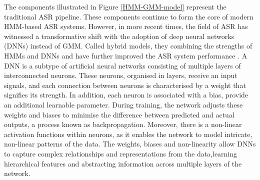 The components illustrated in Figure \ref{HMM-GMM-model} represent the traditional ASR pipeline. These components continue to form the core of modern HMM-based ASR systems. However, in more recent times, the field of ASR has witnessed a transformative shift with the adoption of deep neural networks (DNNs) instead of GMM. Called hybrid models, they combining the strengths of HMMs and DNNs and  have further improved the ASR system performance \cite{hmm-dnn}. A DNN is a subtype of artificial neural networks consisting of multiple layers of interconnected neurons. These neurons, organised in layers, receive an input signals, and each connection between neurons is characterised by a weight that signifies its strength. In addition, each neuron is associated with a bias, provide an additional learnable parameter. During training, the network adjusts these weights and biases to minimise the difference between predicted and actual outputs, a process known as backpropagation. Moreover, there is a non-linear activation functions within neurons, as it enables the network to model intricate, non-linear patterns of the data. The weights, biases and non-linearity allow DNNs to capture complex relationships and representations from the data,learning hierarchical features and abstracting information across multiple layers of the network.

